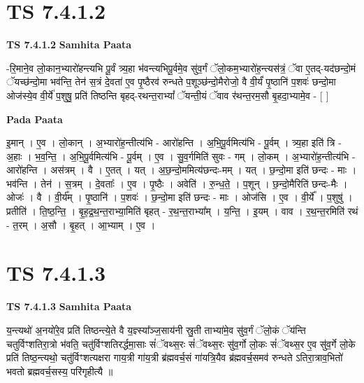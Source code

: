 \documentclass[17pt]{extarticle}
\begin{document}
\section*{ TS 7.4.1.2 }

\textbf{TS 7.4.1.2 } \newline
\textbf{Samhita Paata} \newline

-रि॒माने॒व लो॒कान॒भ्यारो॑हन्त्यभि पू॒र्वं त्र्य॒हा भ॑वन्त्यभिपू॒र्वमे॒व सु॑व॒र्गं ॅलो॒कम॒भ्यारो॑ह॒न्त्यस॑त्रं॒ ॅवा ए॒तद्-यद॑छन्दो॒मं ॅयच्छ॑न्दो॒मा भव॑न्ति॒ तेन॑ स॒त्रं दे॒वता॑ ए॒व पृ॒ष्ठैरव॑ रुन्धते प॒शूञ्छ॑न्दो॒मैरोजो॒ वै वी॒र्यं॑ पृ॒ष्ठानि॑ प॒शवः॑ छन्दो॒मा ओज॑स्ये॒व वी॒र्ये॑ प॒शुषु॒ प्रति॑ तिष्ठन्ति बृहद्-रथन्त॒राभ्यां᳚ ॅयन्ती॒यं ॅवाव र॑थन्त॒रम॒सौ बृ॒हदा॒भ्यामे॒व - [  ] \newline

\textbf{Pada Paata} \newline

इ॒मान् । ए॒व । लो॒कान् । अ॒भ्यारो॑ह॒न्तीत्य॑भि - आरो॑हन्ति । अ॒भि॒पू॒र्वमित्य॑भि - पू॒र्वम् । त्र्य॒हा इति॑ त्रि - अ॒हाः । भ॒व॒न्ति॒ । अ॒भि॒पू॒र्वमित्य॑भि - पू॒र्वम् । ए॒व । सु॒व॒र्गमिति॑ सुवः - गम् । लो॒कम् । अ॒भ्यारो॑ह॒न्तीत्य॑भि - आरो॑हन्ति । अस॑त्रम् । वै । ए॒तत् । यत् । अ॒छ॒न्दो॒ममित्य॑छन्दः-मम् । यत् । छ॒न्दो॒मा इति॑ छन्दः - माः । भव॑न्ति । तेन॑ । स॒त्रम् । दे॒वताः᳚ । ए॒व । पृ॒ष्ठैः । अवेति॑ । रु॒न्ध॒ते॒ । प॒शून् । छ॒न्दो॒मैरिति॑ छन्दः-मैः । ओजः॑ । वै । वी॒र्य᳚म् । पृ॒ष्ठानि॑ । प॒शवः॑ । छ॒न्दो॒मा इति॑ छन्दः - माः । ओज॑सि । ए॒व । वी॒र्ये᳚ । प॒शुषु॑ । प्रतीति॑ । ति॒ष्ठ॒न्ति॒ । बृ॒ह॒द्र॒थ॒न्त॒राभ्या॒मिति॑ बृहत् - र॒थ॒न्त॒राभ्या᳚म् । य॒न्ति॒ । इ॒यम् । वाव । र॒थ॒न्त॒रमिति॑ रथं - त॒रम् । अ॒सौ । बृ॒हत् । आ॒भ्याम् । ए॒व ।  \newline




\section*{ TS 7.4.1.3 }

\textbf{TS 7.4.1.3 } \newline
\textbf{Samhita Paata} \newline

य॒न्त्यथो॑ अ॒नयो॑रे॒व प्रति॑ तिष्ठन्त्ये॒ते वै य॒ज्ञ्स्या᳚ञ्ज॒साय॑नी स्रु॒ती ताभ्या॑मे॒व सु॑व॒र्गं ॅलो॒कं ॅय॑न्ति चतुर्विꣳशतिरा॒त्रो भ॑वति॒ चतु॑र्विꣳशतिरर्द्धमा॒साः सं॑ॅवथ्स॒रः सं॑ॅवथ्स॒रः सु॑व॒र्गो लो॒कः सं॑ॅवथ्स॒र ए॒व सु॑व॒र्गे लो॒के प्रति॑ तिष्ठ॒न्त्यथो॒ चतु॑र्विꣳशत्यक्षरा गाय॒त्री गा॑य॒त्री ब्र॑ह्मवर्च॒सं गा॑यत्रि॒यैव ब्र॑ह्मवर्च॒समव॑ रुन्धते ऽतिरा॒त्राव॒भितो॑ भवतो ब्रह्मवर्च॒सस्य॒ परि॑गृहीत्यै ॥ \newline
\end{document}
